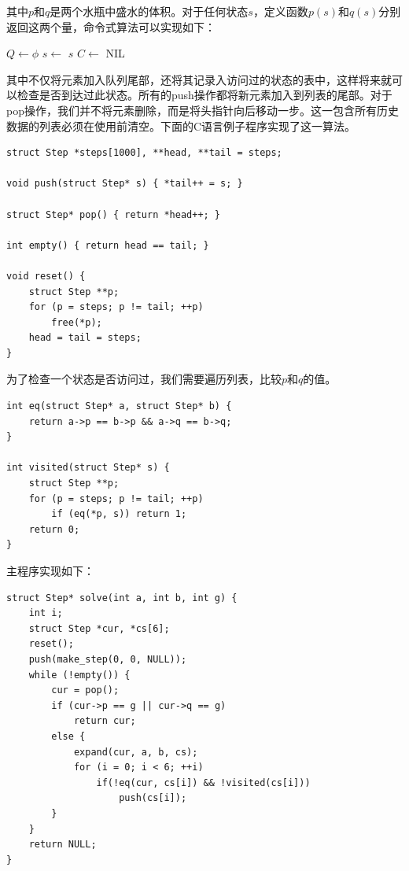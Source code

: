 \documentclass[b5paper]{ctexart}
\begin{document}
其中$p$和$q$是两个水瓶中盛水的体积。对于任何状态$s$，定义函数$p(s)$和$q(s)$分别返回这两个量，命令式算法可以实现如下：

\begin{algorithmic}[1]
  \State $Q \gets \phi$
  \State {}
    \State $s \gets$ 
      \State \Return $s$
    \Else
      \State $C \gets$ 
          \State {}
        \EndIf
      \EndFor
    \EndIf
  \EndWhile
  \State \Return NIL
\EndFunction
\end{algorithmic}

其中不仅将元素加入队列尾部，还将其记录入访问过的状态的表中，这样将来就可以检查是否到达过此状态。所有的push操作都将新元素加入到列表的尾部。对于pop操作，我们并不将元素删除，而是将头指针向后移动一步。这一包含所有历史数据的列表必须在使用前清空。下面的C语言例子程序实现了这一算法。

\lstset{language=C}
\begin{lstlisting}
struct Step *steps[1000], **head, **tail = steps;

void push(struct Step* s) { *tail++ = s; }

struct Step* pop() { return *head++; }

int empty() { return head == tail; }

void reset() {
    struct Step **p;
    for (p = steps; p != tail; ++p)
        free(*p);
    head = tail = steps;
}
\end{lstlisting}

为了检查一个状态是否访问过，我们需要遍历列表，比较$p$和$q$的值。

\lstset{language=C}
\begin{lstlisting}
int eq(struct Step* a, struct Step* b) {
    return a->p == b->p && a->q == b->q;
}

int visited(struct Step* s) {
    struct Step **p;
    for (p = steps; p != tail; ++p)
        if (eq(*p, s)) return 1;
    return 0;
}
\end{lstlisting}

主程序实现如下：

\lstset{language=C}
\begin{lstlisting}
struct Step* solve(int a, int b, int g) {
    int i;
    struct Step *cur, *cs[6];
    reset();
    push(make_step(0, 0, NULL));
    while (!empty()) {
        cur = pop();
        if (cur->p == g || cur->q == g)
            return cur;
        else {
            expand(cur, a, b, cs);
            for (i = 0; i < 6; ++i)
                if(!eq(cur, cs[i]) && !visited(cs[i]))
                    push(cs[i]);
        }
    }
    return NULL;
}
\end{lstlisting}
\end{document}
